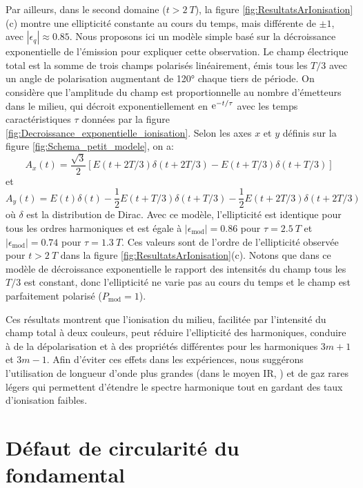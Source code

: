 Par ailleurs, dans le second domaine ($t > 2 \: T$), la figure \ref{fig:ResultatsArIonisation}(c) montre une ellipticité constante au cours du temps, mais différente de $\pm 1$, avec $|\epsilon_q| \approx 0.85$. Nous proposons ici un modèle simple basé sur la décroissance exponentielle de l'émission pour expliquer cette observation. Le champ électrique total est la somme de trois champs polarisés linéairement, émis tous les $T/3$ avec un angle de polarisation augmentant de 120° chaque tiers de période. On considère que l'amplitude du champ est proportionnelle au nombre d'émetteurs dans le milieu, qui décroit exponentiellement en $\mathrm{e}^{-t/\tau}$ avec les temps caractéristiques $\tau$ données par la figure \ref{fig:Decroissance_exponentielle_ionisation}. Selon les axes $x$ et $y$ définis sur la figure \ref{fig:Schema_petit_modele}, on a:
\begin{equation}
A_x (t) = \frac{\sqrt{3}}{2} \left[ E(t+2T/3) \delta(t+2T/3) - E(t+T/3) \delta(t+T/3) \right]
\end{equation}
et
\begin{equation}
A_y (t) = E(t) \delta(t) - \frac{1}{2} E(t+T/3) \delta(t+T/3) - \frac{1}{2} E(t+2T/3) \delta(t+2T/3) 
\end{equation}
où $\delta$ est la distribution de Dirac. Avec ce modèle, l'ellipticité est identique pour tous les ordres harmoniques et est égale à $|\epsilon_{\text{mod}}| = 0.86$ pour $\tau = 2.5 \: T$ et $|\epsilon_{\text{mod}}| = 0.74$ pour $\tau = 1.3 \: T$. Ces valeurs sont de l'ordre de l'ellipticité observée pour $t > 2 \: T$ dans la figure \ref{fig:ResultatsArIonisation}(c). Notons que dans ce modèle de décroissance exponentielle le rapport des intensités du champ tous les $T/3$ est constant, donc l'ellipticité ne varie pas au cours du temps et le champ est parfaitement polarisé ($P_{\text{mod}} = 1$).

Ces résultats montrent que l'ionisation du milieu, facilitée par l'intensité du champ total à deux couleurs, peut réduire l'ellipticité des harmoniques, conduire à de la dépolarisation et à des propriétés différentes pour les harmoniques $3m+1$ et $3m-1$. Afin d'éviter ces effets dans les expériences, nous suggérons l'utilisation de longueur d'onde plus grandes (dans le moyen IR, ) et de gaz rares légers qui permettent d'étendre le spectre harmonique tout en gardant des taux d'ionisation faibles.

\section{Défaut de circularité du fondamental}


